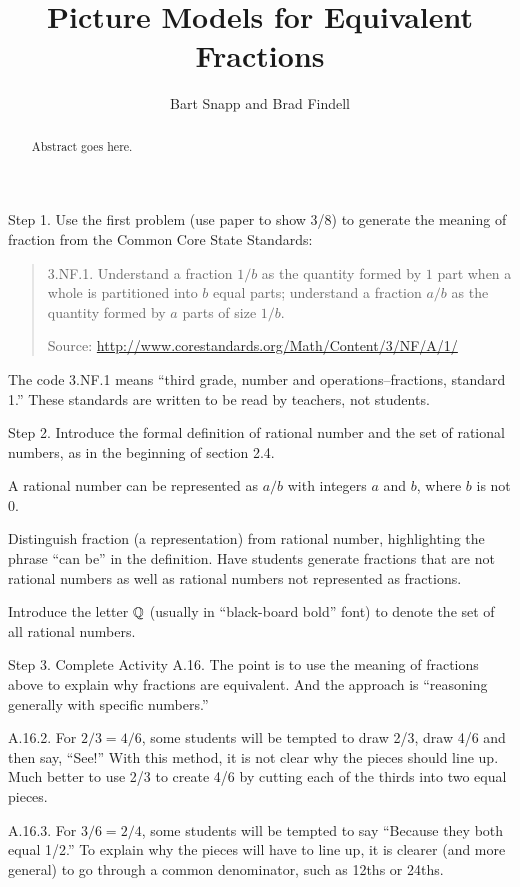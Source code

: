 \documentclass{ximera}
\title{Picture Models for Equivalent Fractions}
\author{Bart Snapp and Brad Findell}
\begin{document}
\begin{abstract}
Abstract goes here.  
\end{abstract}
\maketitle

\label{A:EF}

\begin{teachingnote}
Step 1.  Use the first problem (use paper to show 3/8) to generate the meaning of fraction from the Common Core State Standards:  

\begin{quote}
3.NF.1. Understand a fraction $1/b$ as the quantity formed by $1$ part when a
whole is partitioned into $b$ equal parts; understand a fraction $a/b$ as
the quantity formed by $a$ parts of size $1/b$.

Source:  \url{http://www.corestandards.org/Math/Content/3/NF/A/1/}
\end{quote}

The code 3.NF.1 means ``third grade, number and operations--fractions, standard 1.''  These standards are written to be read by teachers, not students.

Step 2.  Introduce the formal definition of rational number and the set of rational numbers, as in the beginning of section 2.4.  

A rational number can be represented as $a/b$ with integers $a$ and $b$, where $b$ is not $0$.  

Distinguish fraction (a representation) from rational number, highlighting the phrase ``can be'' in the definition.  Have students generate fractions that are not rational numbers as well as rational numbers not represented as fractions.  

Introduce the letter $\mathbb Q$ (usually in ``black-board bold'' font) to denote the set of all rational numbers. 

Step 3.  Complete Activity A.16.  The point is to use the meaning of fractions above to explain why fractions are equivalent.  And the approach is ``reasoning generally with specific numbers.'' 

A.16.2.  For $2/3 = 4/6$, some students will be tempted to draw 2/3, draw 4/6 and then say, ``See!''  With this method, it is not clear why the pieces should line up.  Much better to use 2/3 to create 4/6 by cutting each of the thirds into two equal pieces.  

A.16.3.  For $3/6 = 2/4$, some students will be tempted to say ``Because they both equal 1/2.''  To explain why the pieces will have to line up, it is clearer (and more general) to go through a common denominator, such as 12ths or 24ths.  
 

\end{teachingnote}
\end{document}
